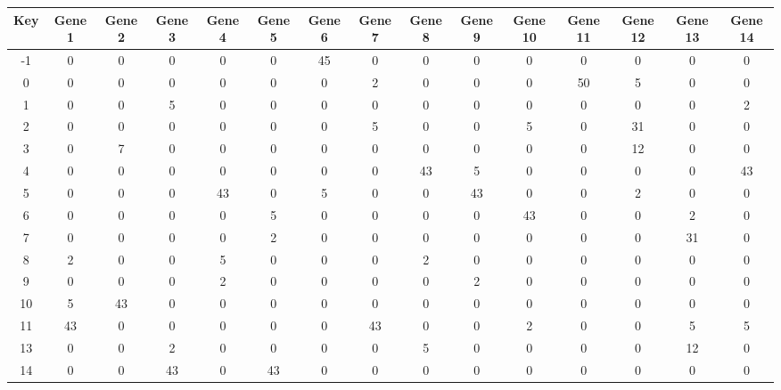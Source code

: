 \begin{tabular}{|c|c|c|c|c|c|c|c|c|c|c|c|c|c|c|}
\hline
Key & Gene 1 & Gene 2 & Gene 3 & Gene 4 & Gene 5 & Gene 6 & Gene 7 & Gene 8 & Gene 9 & Gene 10 & Gene 11 & Gene 12 & Gene 13 & Gene 14 \\
\hline
-1 & 0 & 0 & 0 & 0 & 0 & 45 & 0 & 0 & 0 & 0 & 0 & 0 & 0 & 0 \\
0 & 0 & 0 & 0 & 0 & 0 & 0 & 2 & 0 & 0 & 0 & 50 & 5 & 0 & 0 \\
1 & 0 & 0 & 5 & 0 & 0 & 0 & 0 & 0 & 0 & 0 & 0 & 0 & 0 & 2 \\
2 & 0 & 0 & 0 & 0 & 0 & 0 & 5 & 0 & 0 & 5 & 0 & 31 & 0 & 0 \\
3 & 0 & 7 & 0 & 0 & 0 & 0 & 0 & 0 & 0 & 0 & 0 & 12 & 0 & 0 \\
4 & 0 & 0 & 0 & 0 & 0 & 0 & 0 & 43 & 5 & 0 & 0 & 0 & 0 & 43 \\
5 & 0 & 0 & 0 & 43 & 0 & 5 & 0 & 0 & 43 & 0 & 0 & 2 & 0 & 0 \\
6 & 0 & 0 & 0 & 0 & 5 & 0 & 0 & 0 & 0 & 43 & 0 & 0 & 2 & 0 \\
7 & 0 & 0 & 0 & 0 & 2 & 0 & 0 & 0 & 0 & 0 & 0 & 0 & 31 & 0 \\
8 & 2 & 0 & 0 & 5 & 0 & 0 & 0 & 2 & 0 & 0 & 0 & 0 & 0 & 0 \\
9 & 0 & 0 & 0 & 2 & 0 & 0 & 0 & 0 & 2 & 0 & 0 & 0 & 0 & 0 \\
10 & 5 & 43 & 0 & 0 & 0 & 0 & 0 & 0 & 0 & 0 & 0 & 0 & 0 & 0 \\
11 & 43 & 0 & 0 & 0 & 0 & 0 & 43 & 0 & 0 & 2 & 0 & 0 & 5 & 5 \\
13 & 0 & 0 & 2 & 0 & 0 & 0 & 0 & 5 & 0 & 0 & 0 & 0 & 12 & 0 \\
14 & 0 & 0 & 43 & 0 & 43 & 0 & 0 & 0 & 0 & 0 & 0 & 0 & 0 & 0 \\
\hline
\end{tabular}